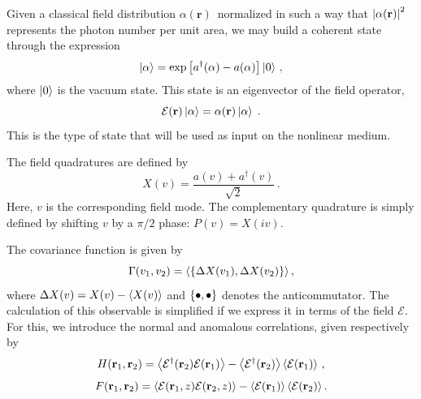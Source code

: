 \documentclass[%
 reprint,
 amsmath,amssymb,
 aps,
pra,
twocolumn,
]{revtex4-2}
\begin{document}
Given a classical field distribution $\alpha(\mathbf{r})\,$ normalized in such a way that $\abs{\alpha(\mathbf{r})}^2$ represents the photon number per unit area, we may build a coherent state through the expression
%
\begin{eqnarray}
    \label{eq:initial-state}
    \ket{\alpha} = \exp\left[a^\dagger(\alpha) - a(\alpha)\right] \ket{0}\,,
\end{eqnarray}
where $\ket{0}$ is the vacuum state. This state is an eigenvector of the field operator,
%
\begin{equation}
    \mathcal{E}(\mathbf{r}) \ket{\alpha} = \alpha(\mathbf{r}) \ket{\alpha}\;.
\end{equation}
This is the type of state that will be used as input on the nonlinear medium.

The field quadratures are defined by
\begin{equation}
    X(v) = \frac{a(v) + a^\dagger(v)}{\sqrt{2}}\,.
\end{equation}
Here, $v$ is the corresponding field mode. The complementary quadrature is simply defined by shifting $v$ by a $\pi/2$ phase: $P(v) = X(iv)$.

The covariance function is given by
\begin{equation}
    \label{eq: covariance}
    \Gamma(v_1, v_2) = \expval{\acomm{\Delta X(v_1)}{\Delta X(v_2)}},
\end{equation}
where $\Delta X(v) = X(v) - \expval{X(v)}$ and $\acomm{\bullet}{\bullet}$ denotes the anticommutator. The calculation of this observable is simplified if we express it in terms of the field $\mathcal{E}$. For this, we introduce the normal and anomalous correlations, given respectively by
\begin{equation}
    \label{eq:FHdefinitions}
    H(\mathbf{r}_1, \mathbf{r}_2)
        = \expval{\mathcal{E}^\dagger(\mathbf{r}_2) \mathcal{E}(\mathbf{r}_1)}
        - \expval{\mathcal{E}^\dagger(\mathbf{r}_2)}
           \expval{\mathcal{E}(\mathbf{r}_1)} \,,
\end{equation}
\begin{equation}
    F(\mathbf{r}_1, \mathbf{r}_2)
        = \expval{\mathcal{E}(\mathbf{r}_1, z) \mathcal{E}(\mathbf{r}_2, z)}
           - \expval{\mathcal{E}(\mathbf{r}_1)}\expval{\mathcal{E}(\mathbf{r}_2)}.
\end{equation}
\end{document}
